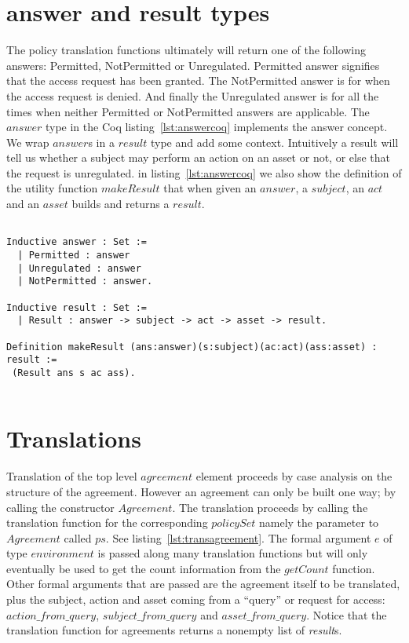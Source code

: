 \section{answer and result types}\label{sec:answerandresulttypes}

The policy translation functions ultimately will return one of the following answers: Permitted, NotPermitted or Unregulated. Permitted answer signifies that the access request has been granted. The NotPermitted answer is for when the access request is denied. And finally the Unregulated answer is for all the times when neither Permitted or NotPermitted answers are applicable. The $answer$ type in the Coq listing~\ref{lst:answercoq} implements the answer concept. We wrap $answer$s in a $result$ type and add some context. Intuitively a result will tell us whether a subject may perform an action on an asset or not, or else that the request is unregulated. in listing~\ref{lst:answercoq} we also show the definition of the utility function $makeResult$ that when given an $answer$, a $subject$, an $act$ and an $asset$ builds and returns a $result$.


\begin{minipage}[c]{0.95\textwidth}
\begin{lstlisting}

Inductive answer : Set :=
  | Permitted : answer
  | Unregulated : answer
  | NotPermitted : answer.
  
Inductive result : Set :=
  | Result : answer -> subject -> act -> asset -> result.
 
Definition makeResult (ans:answer)(s:subject)(ac:act)(ass:asset) : result := 
 (Result ans s ac ass).
 
\end{lstlisting}
\end{minipage}

\section{Translations}


Translation of the top level $agreement$ element proceeds by case analysis on the structure of the agreement. However an agreement can only be built one way; by calling the constructor $Agreement$. The translation proceeds by calling the translation function for the corresponding $policySet$ namely the parameter to $Agreement$ called $ps$. See listing~\ref{lst:transagreement}. The formal argument $e$ of type $environment$ is passed along many translation functions but will only eventually be used to get the count information from the $getCount$ function. Other formal arguments that are passed are the agreement itself to be translated, plus the subject, action and asset coming from a ``query'' or request for access: $action\_from\_query$, $subject\_from\_query$ and $asset\_from\_query$. Notice that the translation function for agreements returns a nonempty list of \emph{result}s.

